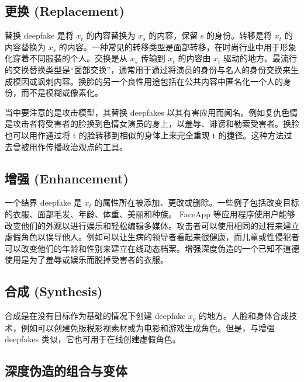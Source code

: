 \subsection{更换 (Replacement)}

替换 deepfake 是将 $x_t$ 的内容替换为 $x_s$ 的内容，保留 s 的身份。转移是将 $x_t$ 的内容替换为 $x_s$ 的内容。一种常见的转移类型是面部转移，在时尚行业中用于形象化穿着不同服装的个人。交换是从 $x_s$ 传输到 $x_t$ 的内容由 $x_t$ 驱动的地方。最流行的交换替换类型是“面部交换”，通常用于通过将演员的身份与名人的身份交换来生成模因或讽刺内容。换脸的另一个良性用途包括在公共内容中匿名化一个人的身份，而不是模糊或像素化。

当中要注意的是攻击模型，其替换 deepfakes 以其有害应用而闻名。例如复仇色情是攻击者将受害者的脸换到色情女演员的身上，以羞辱、诽谤和勒索受害者。换脸也可以用作通过将 t 的脸转移到相似的身体上来完全重现 t 的捷径。这种方法过去曾被用作传播政治观点的工具。


\subsection{增强 (Enhancement)}

一个结界 deepfake 是 $x_t$ 的属性所在被添加、更改或删除。一些例子包括改变目标的衣服、面部毛发、年龄、体重、美丽和种族。 FaceApp 等应用程序使用户能够改变他们的外观以进行娱乐和轻松编辑多媒体。攻击者可以使用相同的过程来建立虚假角色以误导他人。例如可以让生病的领导者看起来很健康，而儿童或性侵犯者可以改变他们的年龄和性别来建立在线动态档案。增强深度伪造的一个已知不道德使用是为了羞辱或娱乐而脱掉受害者的衣服。

\subsection{合成 (Synthesis)}

合成是在没有目标作为基础的情况下创建 deepfake $x_g$ 的地方。人脸和身体合成技术，例如可以创建免版税影视素材或为电影和游戏生成角色。但是，与增强 deepfakes 类似，它也可用于在线创建虚假角色。

\subsection{深度伪造的组合与变体}

